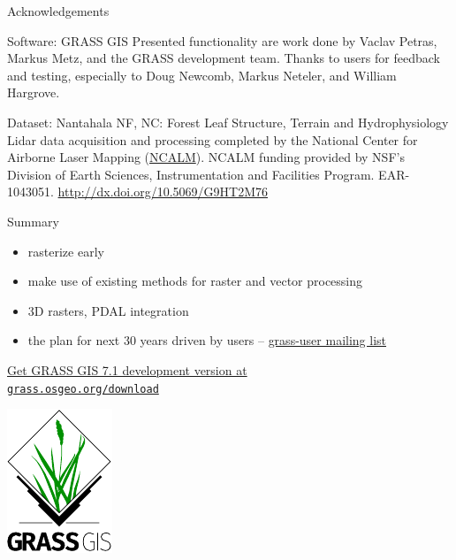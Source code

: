 \documentclass[xcolor={dvipsnames,usenames},beamer,aspectratio=169]{beamer}
\begin{document}
\begin{frame}{Acknowledgements}

\vspace*{0.05\textheight}

\begin{block}{Software: GRASS GIS}
Presented functionality are work done by Vaclav Petras, Markus Metz, and the GRASS development team.
Thanks to users for feedback and testing, especially to Doug Newcomb, Markus Neteler, and William Hargrove.
\end{block}

\begin{block}{Dataset: Nantahala NF, NC: Forest Leaf Structure, Terrain and Hydrophysiology}
Lidar data acquisition and processing completed
by the National Center for Airborne Laser Mapping (\href{http://www.ncalm.org}{NCALM}).
NCALM funding provided by NSF's Division of Earth Sciences, Instrumentation and Facilities Program.
EAR-1043051. \url{http://dx.doi.org/10.5069/G9HT2M76}
\end{block}

\end{frame}


\begin{frame}{}

\vspace*{0.05\textheight}

\begin{block}{Summary}
 \begin{itemize}
  \item rasterize early
  \item make use of existing methods for raster and vector processing
  \item 3D rasters, PDAL integration
  \item the plan for next 30 years driven by users
    -- \href{https://lists.osgeo.org/listinfo/grass-user}{grass-user mailing list}
 \end{itemize}
\end{block}

\bigskip

\centering
\href{https://grass.osgeo.org/download/}{%
Get GRASS GIS 7.1 development version at\\
\texttt{grass.osgeo.org/download}%
}

\smallskip

\includegraphics[height=0.25\textheight]{logos/grass_gis}


\end{frame}
\end{document}
